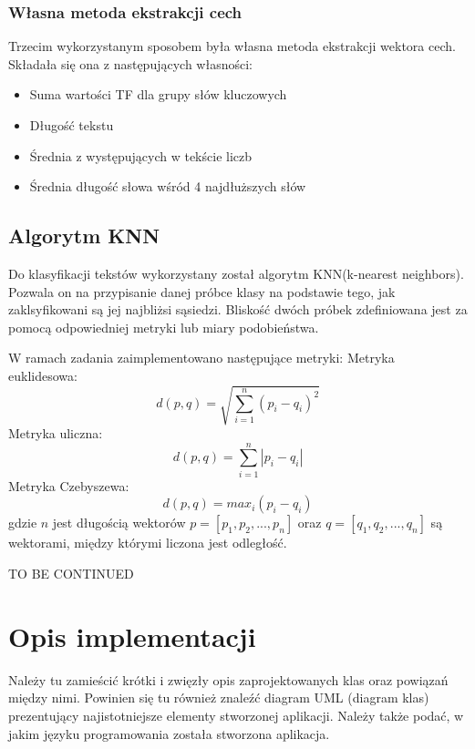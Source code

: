 \documentclass{classrep}
\begin{document}
\subsubsection{Własna metoda ekstrakcji cech}
Trzecim wykorzystanym sposobem była własna metoda ekstrakcji wektora cech. Składała się ona z następujących własności:
\begin{itemize}
	\item Suma wartości TF dla grupy słów kluczowych
	\item Długość tekstu
	\item Średnia z występujących w tekście liczb
	\item Średnia długość słowa wśród 4 najdłuższych słów
\end{itemize}

\subsection{Algorytm KNN}
Do klasyfikacji tekstów wykorzystany został algorytm KNN(k-nearest neighbors). Pozwala on na przypisanie danej próbce klasy na podstawie tego, jak zaklsyfikowani są jej najbliżsi sąsiedzi. Bliskość dwóch próbek zdefiniowana jest za pomocą odpowiedniej metryki lub miary podobieństwa. 

W ramach zadania zaimplementowano następujące metryki: \newline
Metryka euklidesowa:
\begin{equation}
d(p,q) = \sqrt{\sum_{i=1}^{n} (p_{i} -q_{i})^{2}}
\end{equation}
Metryka uliczna:
\begin{equation}
d(p,q) = \sum_{i=1}^{n} |p_{i} -q_{i}|
\end{equation}
Metryka Czebyszewa:
\begin{equation}
d(p,q) = max_{i}(p_{i} -q_{i})
\end{equation}
gdzie \(n\) jest długością wektorów \(p = [p_{1}, p_{2}, ..., p_{n}]\) oraz \(q = [q_{1}, q_{2}, ..., q_{n}]\) są wektorami, między którymi liczona jest odległość. 

{\color{blue}
TO BE CONTINUED }

\section{Opis implementacji}
{\color{blue}
Należy tu zamieścić krótki i zwięzły opis zaprojektowanych klas oraz powiązań
między nimi. Powinien się tu również znaleźć diagram UML  (diagram klas)
prezentujący najistotniejsze elementy stworzonej aplikacji. Należy także
podać, w jakim języku programowania została stworzona aplikacja. }
\end{document}
